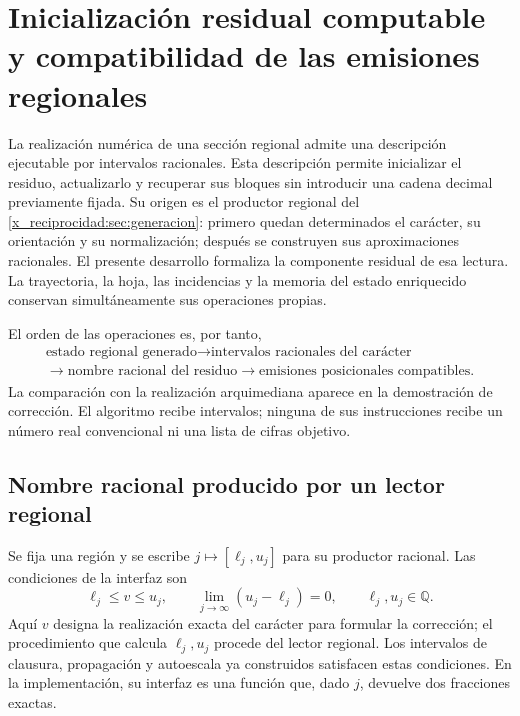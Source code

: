 
\section{Inicialización residual computable y compatibilidad de las emisiones regionales}
\label{sec:residuo-regional-computable}

La realización numérica de una sección regional admite una descripción
ejecutable por intervalos racionales. Esta descripción permite inicializar
el residuo, actualizarlo y recuperar sus bloques sin introducir una cadena
decimal previamente fijada. Su origen es el productor regional del
\cref{x_reciprocidad:sec:generacion}: primero quedan determinados el carácter,
su orientación y su normalización; después se construyen sus aproximaciones
racionales. El presente desarrollo formaliza la componente residual de esa
lectura. La trayectoria, la hoja, las incidencias y la memoria del estado
enriquecido conservan simultáneamente sus operaciones propias.

El orden de las operaciones es, por tanto,
\[
 \begin{gathered}
 \text{estado regional generado}
 \longrightarrow \text{intervalos racionales del carácter}
 \\
 \longrightarrow \text{nombre racional del residuo}
 \longrightarrow \text{emisiones posicionales compatibles}.
 \end{gathered}
\]
La comparación con la realización arquimediana aparece en la demostración
de corrección. El algoritmo recibe intervalos; ninguna de sus instrucciones
recibe un número real convencional ni una lista de cifras objetivo.

\subsection{Nombre racional producido por un lector regional}
\label{subsec:residual-nombre-racional}

Se fija una región y se escribe \(j\mapsto[\ell_j,u_j]\) para su productor
racional. Las condiciones de la interfaz son
\begin{equation}
 \ell_j\leq v\leq u_j,\qquad
 \lim_{j\to\infty}(u_j-\ell_j)=0,
 \qquad \ell_j,u_j\in\mathbb Q.
 \label{eq:residual-contrato-productor}
\end{equation}
Aquí \(v\) designa la realización exacta del carácter para formular la
corrección; el procedimiento que calcula \(\ell_j,u_j\) procede del lector
regional. Los intervalos de clausura, propagación y autoescala ya
construidos satisfacen estas condiciones. En la implementación, su interfaz
es una función que, dado \(j\), devuelve dos fracciones exactas.

